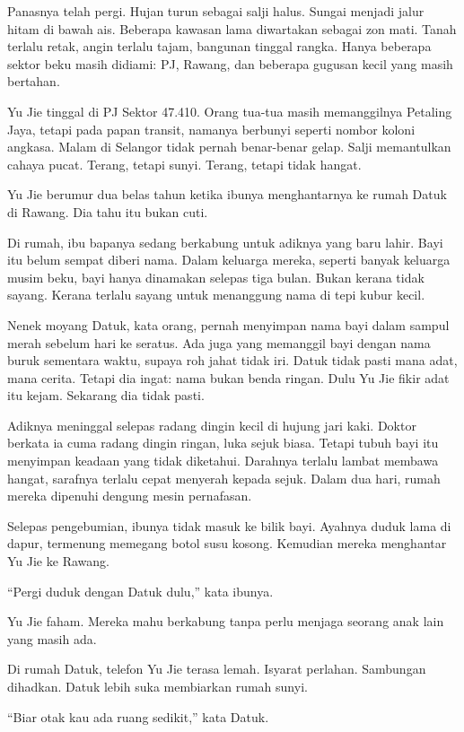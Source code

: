 \documentclass[
  11pt,
  a5paper,
  openany,
  oneside]{book}
\begin{document}
Panasnya telah pergi. Hujan turun sebagai salji halus. Sungai menjadi
jalur hitam di bawah ais. Beberapa kawasan lama diwartakan sebagai zon
mati. Tanah terlalu retak, angin terlalu tajam, bangunan tinggal rangka.
Hanya beberapa sektor beku masih didiami: PJ, Rawang, dan beberapa
gugusan kecil yang masih bertahan.

Yu Jie tinggal di PJ Sektor 47.410. Orang tua-tua masih memanggilnya
Petaling Jaya, tetapi pada papan transit, namanya berbunyi seperti
nombor koloni angkasa. Malam di Selangor tidak pernah benar-benar gelap.
Salji memantulkan cahaya pucat. Terang, tetapi sunyi. Terang, tetapi
tidak hangat.

Yu Jie berumur dua belas tahun ketika ibunya menghantarnya ke rumah
Datuk di Rawang. Dia tahu itu bukan cuti.

Di rumah, ibu bapanya sedang berkabung untuk adiknya yang baru lahir.
Bayi itu belum sempat diberi nama. Dalam keluarga mereka, seperti banyak
keluarga musim beku, bayi hanya dinamakan selepas tiga bulan. Bukan
kerana tidak sayang. Kerana terlalu sayang untuk menanggung nama di tepi
kubur kecil.

Nenek moyang Datuk, kata orang, pernah menyimpan nama bayi dalam sampul
merah sebelum hari ke seratus. Ada juga yang memanggil bayi dengan nama
buruk sementara waktu, supaya roh jahat tidak iri. Datuk tidak pasti
mana adat, mana cerita. Tetapi dia ingat: nama bukan benda ringan. Dulu
Yu Jie fikir adat itu kejam. Sekarang dia tidak pasti.

Adiknya meninggal selepas radang dingin kecil di hujung jari kaki.
Doktor berkata ia cuma radang dingin ringan, luka sejuk biasa. Tetapi
tubuh bayi itu menyimpan keadaan yang tidak diketahui. Darahnya terlalu
lambat membawa hangat, sarafnya terlalu cepat menyerah kepada sejuk.
Dalam dua hari, rumah mereka dipenuhi dengung mesin pernafasan.

Selepas pengebumian, ibunya tidak masuk ke bilik bayi. Ayahnya duduk
lama di dapur, termenung memegang botol susu kosong. Kemudian mereka
menghantar Yu Jie ke Rawang.

``Pergi duduk dengan Datuk dulu,'' kata ibunya.

Yu Jie faham. Mereka mahu berkabung tanpa perlu menjaga seorang anak
lain yang masih ada.

Di rumah Datuk, telefon Yu Jie terasa lemah. Isyarat perlahan. Sambungan
dihadkan. Datuk lebih suka membiarkan rumah sunyi.

``Biar otak kau ada ruang sedikit,'' kata Datuk.
\end{document}
